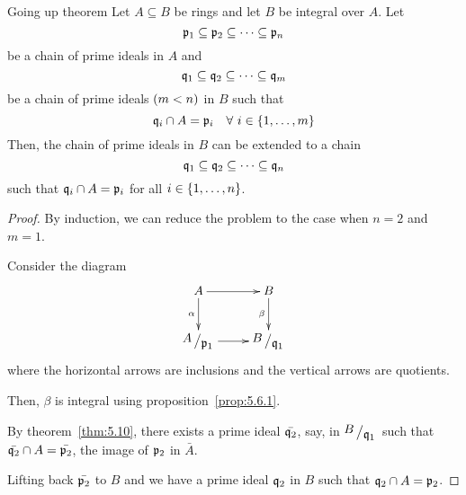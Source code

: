 \begin{theorem}{Going up theorem}{}
\label{thm:5.11}
	Let \(A \subseteq B\) be rings and let \(B\) be integral over \(A\).
	Let
	\[
		\mathfrak{p}_1 \subseteq \mathfrak{p}_2 \subseteq \cdots \subseteq \mathfrak{p}_n
	\]
	be a chain of prime ideals in \(A\) and
	\[
		\mathfrak{q}_1 \subseteq \mathfrak{q}_2 \subseteq \cdots \subseteq \mathfrak{q}_m
	\]
	be a chain of prime ideals \(\left( m < n \right)\) in \(B\) such that
	\[
		\mathfrak{q}_i \cap A = \mathfrak{p}_i \quad \forall\ i \in \left\{ 1, \ldots, m \right\}
	\]
	Then, the chain of prime ideals in \(B\) can be extended to a chain
	\[
		\mathfrak{q}_1 \subseteq \mathfrak{q}_2 \subseteq \cdots \subseteq \mathfrak{q}_n
	\]
	such that \(\mathfrak{q}_i \cap A = \mathfrak{p}_i\)
	for all \(i \in \left\{ 1, \ldots, n \right\}\).
\end{theorem}
\begin{proof}
	By induction, we can reduce the problem to the case
	when \(n = 2\) and \(m = 1\).

	Consider the diagram
	\begin{align*}
		\xymatrix{
			A \ar[d]_-{\alpha} \ar[r]^-{} & B \ar[d]_-{\beta} \\
			\bigslant{A}{\mfp_1} \ar[r]_-{} & \bigslant{B}{\mfq_1}
		}
	\end{align*}
	where the horizontal arrows are inclusions and the vertical arrows
	are quotients.

	Then, \(\beta\) is integral using proposition~\ref{prop:5.6.1}.

	By theorem~\ref{thm:5.10}, there exists a prime ideal \(\bar{\mathfrak{q}_2}\),
	say, in \(\bigslant{B}{\mfq_1}\) such that \(\bar{\mathfrak{q}_2} \cap A
	= \bar{\mathfrak{p}_2}\), the image of \(\mathfrak{p}_2\) in \(\bar{A}\).

	Lifting back \(\bar{\mathfrak{p}_2}\) to \(B\) and we have a prime ideal
	\(\mathfrak{q}_2\) in \(B\) such that \(\mathfrak{q}_2 \cap A = \mathfrak{p}_2\).
\end{proof}